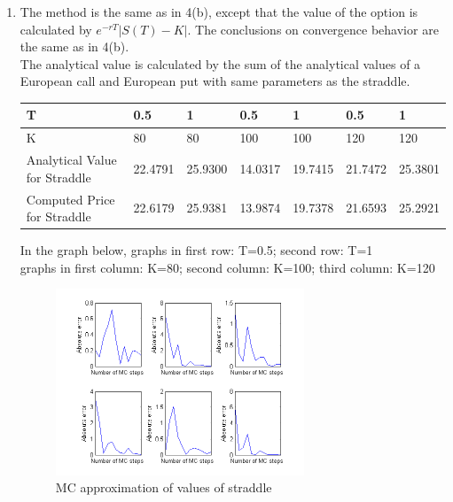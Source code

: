 \documentclass[a4paper]{article}
\begin{document}
\begin{enumerate}
\begin{enumerate}
\pagebreak

\item
The method is the same as in 4(b), except that the value of the option is calculated by $e^{-rT}|S(T)-K|$. The conclusions on convergence behavior are the same as in 4(b).\\
The analytical value is calculated by the sum of the analytical values of a European call and European put with same parameters as the straddle.\\

\begin{table}[ht]
	\centering
    \begin{tabular}{|l|l|l|l|l|l|l|}
    \hline
    T                             & 0.5     & 1       & 0.5     & 1       & 0.5     & 1       \\ \hline
    K                             & 80      & 80      & 100     & 100     & 120     & 120     \\ \hline
    Analytical Value for Straddle & 22.4791 & 25.9300 & 14.0317 & 19.7415 & 21.7472 & 25.3801 \\ \hline
    Computed Price for Straddle   & 22.6179 & 25.9381 & 13.9874 & 19.7378 & 21.6593 & 25.2921 \\ \hline
    \end{tabular}
\end{table}

In the graph below, graphs in first row: T=0.5; second row: T=1\\
graphs in first column: K=80; second column: K=100; third column: K=120
\begin{figure}[ht]
\centering
\includegraphics[width=0.7\textwidth]{Q4d.png}
\caption{\label{fig:fig04} MC approximation of values of straddle}
\end{figure}

\end{enumerate}


\end{enumerate}
\end{document}
